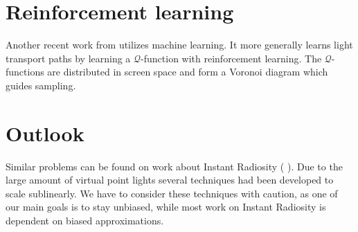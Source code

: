 \section{Reinforcement learning}

Another recent work from \cite{DBLP:journals/corr/DahmK17} utilizes machine learning. It more generally learns light transport paths by learning a $\mathcal{Q}$-function with reinforcement learning. The $\mathcal{Q}$-functions are distributed in screen space and form a Voronoi diagram which guides sampling.

\section{Outlook}

Similar problems can be found on work about Instant Radiosity (\cite{keller1997instant} \cite{Walter2005LightcutsAS} \cite{dachsbacher2014scalable}). Due to the large amount of virtual point lights several techniques had been developed to scale sublinearly. We have to consider these techniques with caution, as one of our main goals is to stay unbiased, while most work on Instant Radiosity is dependent on biased approximations.
